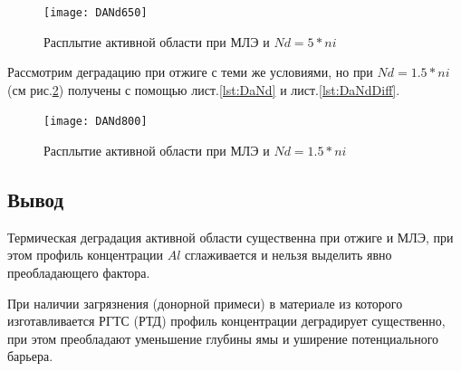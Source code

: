 \begin{figure}[h!]
	\centering
	\texttt{[image: DANd650]}
	\caption{Расплытие активной области при МЛЭ и $Nd = 5*ni$}
	\label{fig:DANd650}
\end{figure}

Рассмотрим деградацию при отжиге с теми же условиями, но при $Nd = 1.5*ni$ (см рис.\ref{fig:DANd800}) получены с помощью лист.\ref{lst:DaNd} и лист.\ref{lst:DaNdDiff}.

\begin{figure}[h!]
	\centering
	\texttt{[image: DANd800]}
	\caption{Расплытие активной области при МЛЭ и $Nd = 1.5*ni$}
	\label{fig:DANd800}
\end{figure}


\subsection{Вывод}
Термическая деградация активной области существенна при отжиге и МЛЭ, при этом профиль концентрации $Al$ сглаживается и нельзя выделить явно преобладающего фактора.

При наличии загрязнения (донорной примеси) в материале из которого изготавливается РГТС (РТД) профиль концентрации деградирует существенно, при этом преобладают уменьшение глубины ямы и уширение потенциального барьера.